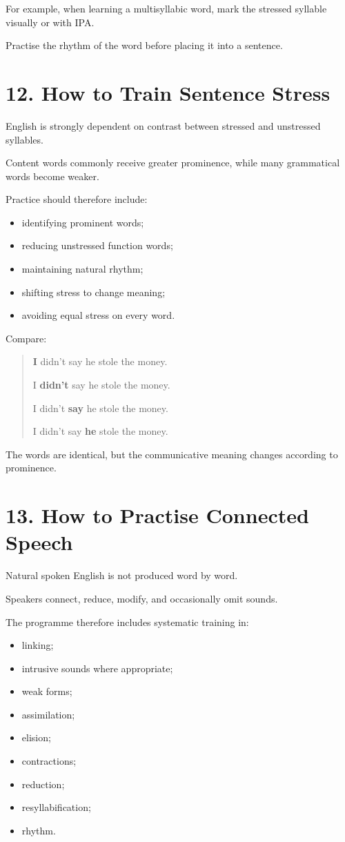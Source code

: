 For example, when learning a multisyllabic word, mark the stressed syllable visually or with IPA.

Practise the rhythm of the word before placing it into a sentence.

\section*{12. How to Train Sentence Stress}

English is strongly dependent on contrast between stressed and unstressed syllables.

Content words commonly receive greater prominence, while many grammatical words become weaker.

Practice should therefore include:

\begin{itemize}
    \item identifying prominent words;
    \item reducing unstressed function words;
    \item maintaining natural rhythm;
    \item shifting stress to change meaning;
    \item avoiding equal stress on every word.
\end{itemize}

Compare:

\begin{quote}
\textbf{I} didn't say he stole the money.

I \textbf{didn't} say he stole the money.

I didn't \textbf{say} he stole the money.

I didn't say \textbf{he} stole the money.
\end{quote}

The words are identical, but the communicative meaning changes according to prominence.

\section*{13. How to Practise Connected Speech}

Natural spoken English is not produced word by word.

Speakers connect, reduce, modify, and occasionally omit sounds.

The programme therefore includes systematic training in:

\begin{itemize}
    \item linking;
    \item intrusive sounds where appropriate;
    \item weak forms;
    \item assimilation;
    \item elision;
    \item contractions;
    \item reduction;
    \item resyllabification;
    \item rhythm.
\end{itemize}

